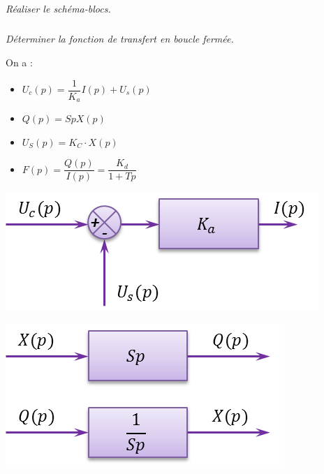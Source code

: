 \documentclass[10pt,fleqn]{article} %
\begin{document}
\begin{multicols}{2}
\subparagraph{}
\textit{Réaliser le schéma-blocs.}

\subparagraph{}
\textit{Déterminer la fonction de transfert en boucle fermée.}

\ifprof

\begin{corrige}
On a :
\begin{itemize}
\item $U_c(p)=\dfrac{1}{K_a}I(p)+U_s(p)$
\item $Q(p)=SpX(p)$
\item $U_S(p)=K_C\cdot X(p)$
\item $F(p)=\dfrac{Q(p)}{I(p)}=\dfrac{K_d}{1+Tp}$
\end{itemize}


\begin{minipage}[c]{.23\linewidth}
\begin{center}
\includegraphics[width=.95\textwidth]{images/bloc1}
\end{center}
\end{minipage}\hfill
\begin{minipage}[c]{.23\linewidth}
\begin{center}
\includegraphics[width=.95\textwidth]{images/bloc2}
\end{center}
\end{minipage}\hfill
\begin{minipage}[c]{.23\linewidth}
\begin{center}

\end{center}
\end{minipage}
\end{corrige}
\end{multicols}
\end{document}
